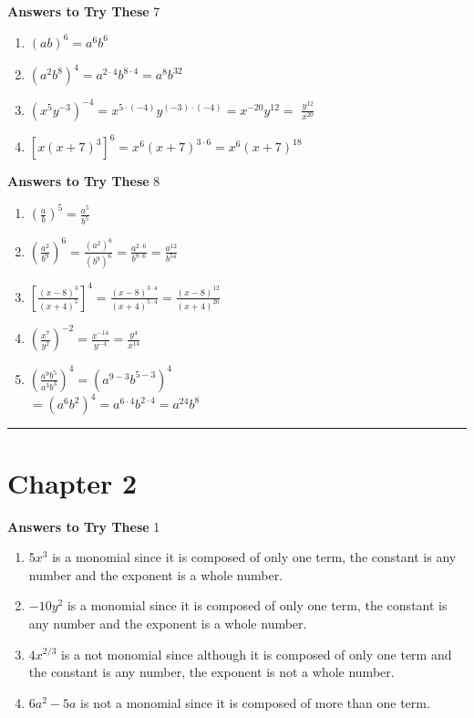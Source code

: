 \documentclass[a4paper]{JAC2003}
\begin{document}
\noindent\textcolor{red!75!black}{\textbf{Answers to Try These}} 7
\begin{enumerate}
\item $(a b)^{6}=a^{6} b^{6}$

\item $\left(a^{2} b^{8}\right)^{4}=a^{2 \cdot 4} b^{8 \cdot 4}=a^{8} b^{32}$

\item $\left(x^{5} y^{-3}\right)^{-4}=x^{5 \cdot(-4)} y^{(-3) \cdot(-4)}=x^{-20} y^{12}=$ $\frac{y^{12}}{x^{20}}$

\item $\left[x(x+7)^{3}\right]^{6}=x^{6}(x+7)^{3 \cdot 6}=x^{6}(x+7)^{18}$
\end{enumerate}

\noindent\textcolor{red!75!black}{\textbf{Answers to Try These}} 8
\begin{enumerate}
\item $\left(\frac{a}{b}\right)^{5}=\frac{a^{5}}{b^{5}}$

\item $\left(\frac{a^{2}}{b^{9}}\right)^{6}=\frac{\left(a^{2}\right)^{6}}{\left(b^{9}\right)^{6}}=\frac{a^{2 \cdot 6}}{b^{9 \cdot 6}}=\frac{a^{12}}{b^{54}}$

\item $\left[\frac{(x-8)^{3}}{(x+4)^{5}}\right]^{4}=\frac{(x-8)^{3 \cdot 4}}{(x+4)^{5 \cdot 4}}=\frac{(x-8)^{12}}{(x+4)^{20}}$

\item $\left(\frac{x^{7}}{y^{2}}\right)^{-2}=\frac{x^{-14}}{y^{-4}}=\frac{y^{4}}{x^{14}}$

\item  $\left(\frac{a^{9} b^{5}}{a^{3} b^{3}}\right)^{4}=\left(a^{9-3} b^{5-3}\right)^{4}$ \\
$=\left(a^{6} b^{2}\right)^{4}=a^{6 \cdot 4} b^{2 \cdot 4}=a^{24} b^{8}$
\end{enumerate}

\noindent\rule[0.5ex]{\linewidth}{1pt}
\section{Chapter 2}

\noindent\textcolor{red!75!black}{\textbf{Answers to Try These}} 1
\begin{enumerate}
\item $5 x^{3}$ is a monomial since it is composed of only one term, the constant is any number and the exponent is a whole number.

\item $-10 y^{2}$ is a monomial since it is composed of only one term, the constant is any number and the exponent is a whole number.

\item $4 x^{2 / 3}$ is a not monomial since although it is composed of only one term and the constant is any number, the exponent is not a whole number.

\item $6 a^{2}-5 a$ is not a monomial since it is composed of more than one term.
\end{enumerate}
\end{document}
